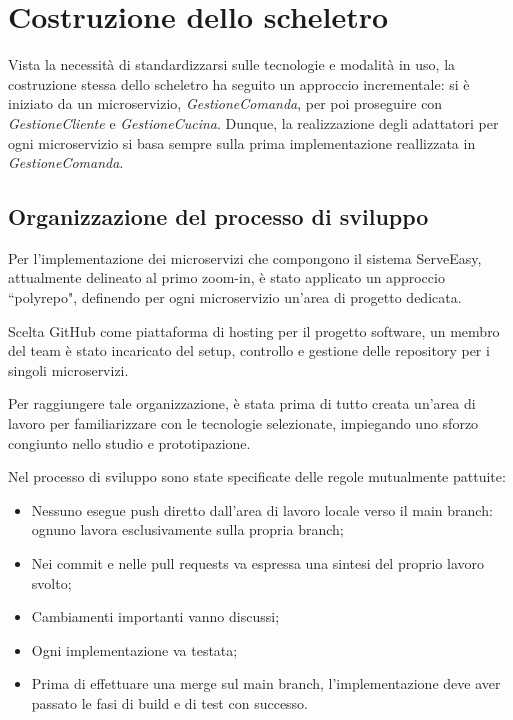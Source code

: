 \section{Costruzione dello scheletro}
Vista la necessità di standardizzarsi sulle tecnologie e modalità in uso, la costruzione stessa dello scheletro 
ha seguito un approccio incrementale: si è iniziato da un microservizio, \textit{GestioneComanda}, per poi proseguire con \textit{GestioneCliente} e \textit{GestioneCucina}.
Dunque, la realizzazione degli adattatori per ogni microservizio si basa sempre sulla prima implementazione reallizzata in \textit{GestioneComanda}.

\subsection{Organizzazione del processo di sviluppo}
Per l’implementazione dei microservizi che compongono il sistema ServeEasy, attualmente delineato al primo zoom-in, è stato applicato un approccio “polyrepo"\cite{polyrepo}, definendo per ogni microservizio un’area di progetto dedicata. 

Scelta GitHub come piattaforma di hosting per il progetto software, un membro del team è stato incaricato del setup, controllo e gestione delle repository per i singoli microservizi.

Per raggiungere tale organizzazione, è stata prima di tutto creata un’area di lavoro per familiarizzare con le tecnologie selezionate, impiegando uno sforzo congiunto nello studio e prototipazione.

Nel processo di sviluppo sono state specificate delle regole mutualmente pattuite:
\begin{itemize}
    \item Nessuno esegue push diretto dall’area di lavoro locale verso il main branch: ognuno lavora esclusivamente sulla propria branch;
    \item Nei commit e nelle pull requests va espressa una sintesi del proprio lavoro svolto;
\item Cambiamenti importanti vanno discussi;
\item Ogni implementazione va testata;
\item Prima di effettuare una merge sul main branch, l’implementazione deve aver passato le fasi di build e di test con successo.
\end{itemize}

